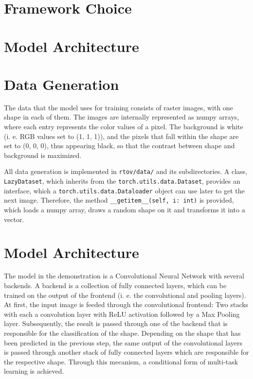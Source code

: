 \documentclass[12pt, a4paper, titlepage]{report}
\begin{document}


\section{Framework Choice}

\section{Model Architecture}


\section{Data Generation}

The data that the model uses for training consists of raster images, with one shape in each of them. The images are internally represented as numpy arrays, where each entry represents the color values of a pixel. The background is white (i. e. RGB values set to (1, 1, 1)), and the pixels that fall within the shape are set to (0, 0, 0), thus appearing black, so that the contrast between shape and background is maximized.

All data generation is implemented in \lstinline{rtov/data/} and its subdirectories. A class, \lstinline{LazyDataset}, which inherits from the \lstinline{torch.utils.data.Dataset}, provides an interface, which a \lstinline{torch.utils.data.Dataloader} object can use later to get the next image. Therefore, the method \lstinline{__getitem__(self, i: int)} is provided, which loads a numpy array, draws a random shape on it and transforms it into a vector.

\section{Model Architecture}

The model in the demonstration is a Convolutional Neural Network with several backends. A backend is a collection of fully connected layers, which can be trained on the output of the frontend (i. e. the convolutional and pooling layers). At first, the input image is feeded through the convolutional frontend: Two stacks with each a convolution layer with ReLU activation followed by a Max Pooling layer. Subsequently, the result is passed through one of the backend that is responsible for the classification of the shape. Depending on the shape that has been predicted in the previous step, the same output of the convolutional layers is passed through another stack of fully connected layers which are responsible for the respective shape. Through this mecanism, a conditional form of multi-task learning is achieved.
\end{document}
